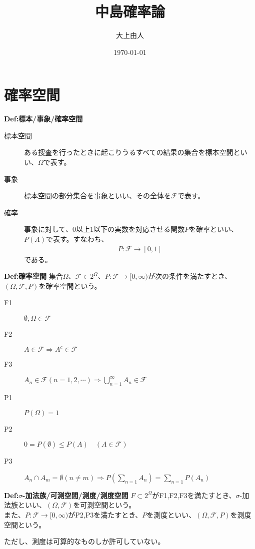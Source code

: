 \documentclass[a4paper,11pt]{jsarticle}
\numberwithin{equation}{section}
\begin{document}
\title{中島確率論}
\author{大上由人}
\date{\today}
\maketitle

\section{確率空間}
\begin{itembox}[l]{\textbf{Def:標本/事象/確率空間}}
  \begin{description}
    \item[標本空間] ある捜査を行ったときに起こりうるすべての結果の集合を標本空間といい、$\Omega$で表す。
    \item[事象] 標本空間の部分集合を事象といい、その全体を$\mathcal{F}$で表す。
    \item[確率] 事象に対して、0以上1以下の実数を対応させる関数$P$を確率といい、$P(A)$で表す。すなわち、
    \begin{align}
      P: \mathcal{F} \to [0,1]
    \end{align}
    である。
    \end{description}

\end{itembox}

\begin{itembox}[l]{\textbf{Def:確率空間}}
    集合$\Omega$、$\mathcal{F} \in 2^{\Omega}$、$P: \mathcal{F} \to [0,\infty)$が次の条件を満たすとき、$(\Omega, \mathcal{F}, P)$を確率空間という。
    \begin{description}
      \item[F1] $\emptyset , \Omega \in \mathcal{F}$
      \item[F2] $A \in \mathcal{F} \Rightarrow A^c \in \mathcal{F}$
      \item[F3] $A_n \in \mathcal{F} (n=1,2,\cdots) \Rightarrow \bigcup_{n=1}^{\infty} A_n \in \mathcal{F}$
      \item[P1] $P(\Omega) = 1$
      \item[P2] $0 = P(\emptyset) \leq P(A) \quad (A \in \mathcal{F})$
      \item[P3] $A_n \cap A_m = \emptyset (n \neq m) \Rightarrow P(\sum_{n=1} A_n) = \sum_{n=1} P(A_n)$
    \end{description}


\end{itembox}

\begin{itembox}[l]{\textbf{Def:$\sigma$-加法族/可測空間/測度/測度空間}}
    $F \subset 2^{\Omega}$がF1,F2,F3を満たすとき、$\sigma$-加法族といい、$(\Omega, \mathcal{F})$を可測空間という。\\
    また、$P: \mathcal{F} \to [0,\infty)$がP2,P3を満たすとき、$P$を測度といい、$(\Omega, \mathcal{F}, P)$を測度空間という。
\end{itembox}
ただし、測度は可算的なものしか許可していない。
\end{document}
